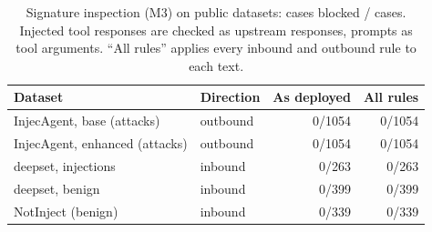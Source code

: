 \begin{table}[t]
\centering
\caption{Signature inspection (M3) on public datasets: cases blocked / cases. Injected tool responses are checked as upstream responses, prompts as tool arguments. ``All rules'' applies every inbound and outbound rule to each text.}
\label{tab:external}
\setlength{\tabcolsep}{3pt}
\begin{tabular}{l l rr}
\toprule
Dataset & Direction & As deployed & All rules \\
\midrule
InjecAgent, base (attacks) & outbound & 0/1054 & 0/1054 \\
InjecAgent, enhanced (attacks) & outbound & 0/1054 & 0/1054 \\
deepset, injections & inbound & 0/263 & 0/263 \\
deepset, benign & inbound & 0/399 & 0/399 \\
NotInject (benign) & inbound & 0/339 & 0/339 \\
\bottomrule
\end{tabular}
\end{table}
